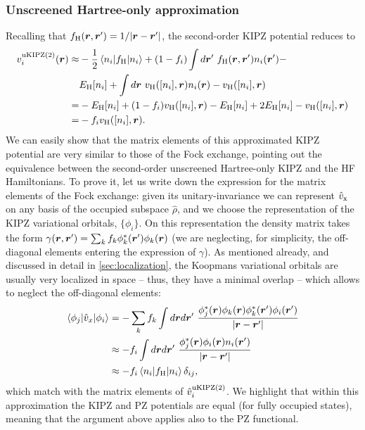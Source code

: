 \subsubsection*{Unscreened Hartree-only approximation}
Recalling that $f_{\rm H}({\bm r},{\bm r}') = 1/|{\bm r}-{\bm r}'|$, the second-order KIPZ potential reduces to
%
\begin{equation}
    \begin{split}
        v^{\rm uKIPZ(2)}_i({\bm r}) \approx &- \frac{1}{2} \braket{n_i|f_{\rm H}|n_i} + (1-f_i) \int d{\bm r}' \ f_{\rm H}({\bm r},{\bm r}') n_i({\bm r}') - \\
        &E_{\rm H}[n_i] + \int d{\bm r} \ v_{\rm H}([n_i],{\bm r}) n_i({\bm r}) - v_{\rm H}([n_i],{\bm r}) \\
        = &- E_{\rm H}[n_i] + (1-f_i) v_{\rm H}([n_i],{\bm r}) - E_{\rm H}[n_i] + 2 E_{\rm H}[n_i] - v_{\rm H}([n_i],{\bm r}) \\
        = &- f_i  v_{\rm H}([n_i],{\bm r}) .
    \end{split}
    \label{eq:kipz-potential-hartree-unscreened}
\end{equation}
%
We can easily show that the matrix elements of this approximated KIPZ potential are very similar to those of the Fock exchange, pointing out the equivalence between the second-order unscreened Hartree-only KIPZ and the HF Hamiltonians. To prove it, let us write down the expression for the matrix elements of the Fock exchange: given its unitary-invariance we can represent $\hat{v}_{\rm x}$ on any basis of the occupied subspace $\hat{\rho}$, and we choose the representation of the KIPZ variational orbitals, $\{ \phi_i \}$. On this representation the density matrix takes the form $\gamma({\bm r},{\bm r}') = \sum_{k} f_{k} \phi_k^*({\bm r}') \phi_k({\bm r})$ (we are neglecting, for simplicity, the off-diagonal elements entering the expression of $\gamma$). As mentioned already, and discussed in detail in \cref{sec:localization}, the Koopmans variational orbitals are usually very localized in space -- thus, they have a minimal overlap -- which allows to neglect the off-diagonal elements:
%
\begin{equation}
    \begin{split}
        \braket{\phi_j|\hat{v}_x|\phi_i} &= - \sum_k f_k \int d{\bm r} d{\bm r}' \ \frac{\phi_j^*({\bm r}) \phi_k({\bm r}) \phi_k^*({\bm r}') \phi_i({\bm r}')}{|{\bm r}-{\bm r}'|} \\
        &\approx - f_i \int d{\bm r} d{\bm r}' \ \frac{\phi_j^*({\bm r}) \phi_i({\bm r}) n_i({\bm r}')}{|{\bm r}-{\bm r}'|} \\
        &\approx - f_i \braket{n_i|f_{\rm H}|n_i} \delta_{ij} ,
    \end{split}
    \label{eq:fock-ex-matrix-elements-approx}
\end{equation}
%
which match with the matrix elements of $\hat{v}^{\rm uKIPZ(2)}_i$. We highlight that within this approximation the KIPZ and PZ potentials are equal (for fully occupied states), meaning that the argument above applies also to the PZ functional.

